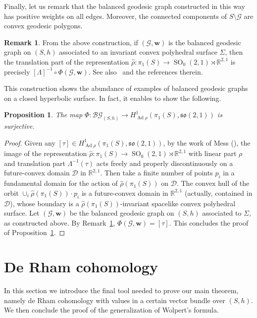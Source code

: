 \documentclass[11pt]{article}
\newtheorem{prop}[theo]{Proposition}
\theoremstyle{definition}
\newtheorem{rema}[theo]{Remark}
\numberwithin{equation}{section}
\numberwithin{figure}{section}
\numberwithin{table}{section}
\newcommand{\BG}{\mathcal{BG}}
\newcommand{\R}{{\mathbb R}}
\newcommand{\so}{\mathfrak{so}}
\DeclareMathOperator{\Ad}{Ad}
\DeclareMathOperator{\SO}{SO}
\begin{document}
Finally, let us remark that the balanced geodesic graph constructed in this way has positive weights on all edges. Moreover, the connected components of $S\setminus \mathcal G$ are convex geodesic polygons.

\begin{rema}\label{remark phi holonomy}
From the above construction, if $(\mathcal G,\mathbf w)$ is the balanced geodesic graph on $(S,h)$ associated to an invariant convex polyhedral surface $\Sigma$, then the translation part of the representation $\widehat \rho:\pi_1(S)\to \SO_0(2,1)\rtimes\R^{2,1}$ is precisely $[\Lambda]^{-1}\circ\Phi(\mathcal G,\mathbf w)$. {See also~\cite[Section~4.4]{Fillastre} and the references therein}.
\end{rema}

This construction shows the abundance of examples of balanced geodesic graphs on a closed hyperbolic surface. In fact, it enables to show the following.

\begin{prop}\label{prop5.2}
The map $\Phi:\BG_{(S,h)}\to H^1_{\Ad\rho}(\pi_1(S),\so(2,1))$ is surjective.
\end{prop}


\begin{proof}
Given any $[\tau]\in H^1_{\Ad\rho}(\pi_1(S),\so(2,1))$, by the work of Mess (\cite{mess}), the image of the representation $\widehat \rho:\pi_1(S)\to \SO_0(2,1)\rtimes\R^{2,1}$ with linear part $\rho$ and translation part $\Lambda^{-1}(\tau)$ acts freely and properly discontinuously on a future-convex domain $\mathcal D$ in $\R^{2,1}$. Then take a finite number of points $p_i$ in a fundamental domain for the action of $\widehat \rho(\pi_1(S))$ on $\mathcal D$. The convex hull of the orbit $\cup_i \widehat \rho(\pi_1(S))\cdot p_i$ is a future-convex domain in $\R^{2,1}$ (actually, contained in $\mathcal D$), whose boundary is a $\widehat \rho(\pi_1(S))$-invariant spacelike convex polyhedral surface. Let $(\mathcal G,\mathbf w)$ be the balanced geodesic graph on $(S,h)$ associated to $\Sigma$, as constructed above. By Remark~\ref{remark phi holonomy}, $\Phi(\mathcal G,\mathbf w)=[\tau]$. This concludes the proof of Proposition~\ref{prop5.2}.
\end{proof}


\section{De Rham cohomology}\label{sec de rham}

In this section we introduce the final tool needed to prove our main theorem, namely de Rham cohomology with values in a certain vector bundle over $(S,h)$. We then conclude the proof of the generalization of Wolpert's formula.
\end{document}
